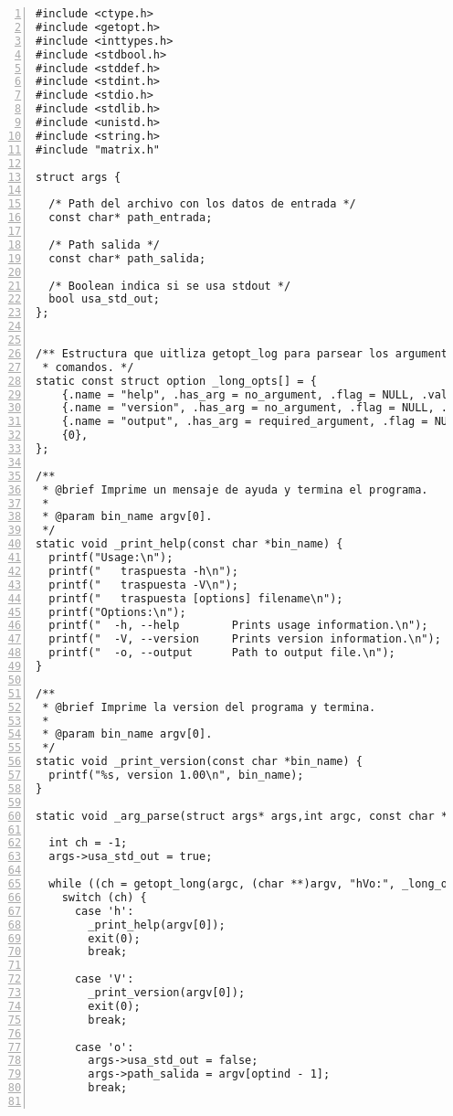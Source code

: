 \documentclass[11pt,a4paper]{article}
\begin{document}
\begin{lstlisting}[numbers=left, tabsize=2, basicstyle=\fontsize{11}{13}\ttfamily, frame=single, caption={makefile}]
#include <ctype.h>
#include <getopt.h>
#include <inttypes.h>
#include <stdbool.h>
#include <stddef.h>
#include <stdint.h>
#include <stdio.h>
#include <stdlib.h>
#include <unistd.h>
#include <string.h>
#include "matrix.h"

struct args {

  /* Path del archivo con los datos de entrada */
  const char* path_entrada;

  /* Path salida */
  const char* path_salida;
  
  /* Boolean indica si se usa stdout */
  bool usa_std_out;
};


/** Estructura que uitliza getopt_log para parsear los argumentos de linea de
 * comandos. */
static const struct option _long_opts[] = {
    {.name = "help", .has_arg = no_argument, .flag = NULL, .val = 'h'},
    {.name = "version", .has_arg = no_argument, .flag = NULL, .val = 'V'},
    {.name = "output", .has_arg = required_argument, .flag = NULL, .val = 'o'},
    {0},
};

/**
 * @brief Imprime un mensaje de ayuda y termina el programa.
 *
 * @param bin_name argv[0].
 */
static void _print_help(const char *bin_name) {
  printf("Usage:\n");
  printf("   traspuesta -h\n");
  printf("   traspuesta -V\n");
  printf("   traspuesta [options] filename\n");
  printf("Options:\n");
  printf("  -h, --help        Prints usage information.\n");
  printf("  -V, --version     Prints version information.\n");
  printf("  -o, --output      Path to output file.\n");
}

/**
 * @brief Imprime la version del programa y termina.
 *
 * @param bin_name argv[0].
 */
static void _print_version(const char *bin_name) {
  printf("%s, version 1.00\n", bin_name);
}

static void _arg_parse(struct args* args,int argc, const char **argv) {
    
  int ch = -1;
  args->usa_std_out = true;

  while ((ch = getopt_long(argc, (char **)argv, "hVo:", _long_opts, NULL)) != -1) {
    switch (ch) {
      case 'h':
        _print_help(argv[0]);
        exit(0);
        break;

      case 'V':
        _print_version(argv[0]);
        exit(0);
        break;
        
      case 'o':
        args->usa_std_out = false;
        args->path_salida = argv[optind - 1];
        break;
        

\end{lstlisting}
\end{document}
